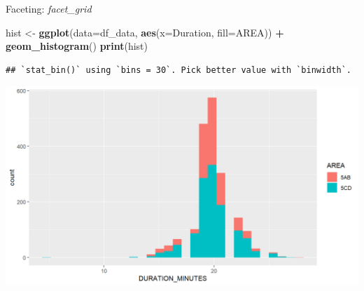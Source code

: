 \documentclass[
  ignorenonframetext,
]{beamer}
\newenvironment{Shaded}{\begin{snugshade}}{\end{snugshade}}
\newcommand{\DataTypeTok}[1]{\textcolor[rgb]{0.13,0.29,0.53}{#1}}
\newcommand{\KeywordTok}[1]{\textcolor[rgb]{0.13,0.29,0.53}{\textbf{#1}}}
\newcommand{\NormalTok}[1]{#1}
\newcommand{\OperatorTok}[1]{\textcolor[rgb]{0.81,0.36,0.00}{\textbf{#1}}}
\newcommand{\StringTok}[1]{\textcolor[rgb]{0.31,0.60,0.02}{#1}}
\begin{document}
\begin{frame}[fragile]{Faceting: \emph{facet\_grid}}
\protect\hypertarget{faceting-facet_grid}{}

\begin{Shaded}
\begin{Highlighting}[]
\NormalTok{hist <-}\StringTok{ }\KeywordTok{ggplot}\NormalTok{(}\DataTypeTok{data=}\NormalTok{df_data, }\KeywordTok{aes}\NormalTok{(}\DataTypeTok{x=}\NormalTok{Duration, }\DataTypeTok{fill=}\NormalTok{AREA)) }\OperatorTok{+}
\StringTok{  }\KeywordTok{geom_histogram}\NormalTok{()}
\KeywordTok{print}\NormalTok{(hist)}
\end{Highlighting}
\end{Shaded}

\begin{verbatim}
## `stat_bin()` using `bins = 30`. Pick better value with `binwidth`.
\end{verbatim}

\begin{center}\includegraphics[width=0.8\linewidth]{figure/facet_wrap_0-1} \end{center}

\end{frame}
\end{document}
